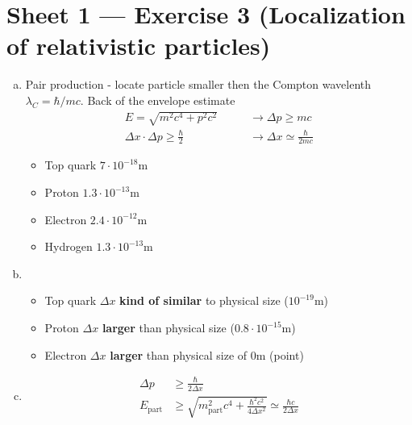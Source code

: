 \documentclass[10pt,a4paper]{report}
\theoremstyle{definition}
\begin{document}
\begin{enumerate}[a)]
\begin{center}
\begin{tikzpicture}[scale=1.2][!]
\end{tikzpicture}
\end{center}


\end{enumerate}


\section{Sheet 1 — Exercise 3 (Localization of relativistic particles)}
\begin{enumerate}[a)]
\item Pair production - locate particle smaller then the Compton wavelenth $\lambda_C=\hbar/mc$. Back of the envelope estimate
\begin{align}
E=\sqrt{m^2c^4+p^2c^2}\qquad&\rightarrow\Delta p\geq mc\\
\Delta x \cdot\Delta p\geq\frac{\hbar}{2}\qquad&\rightarrow\Delta x \simeq\frac{\hbar}{2mc}
\end{align}
\begin{itemize}
\item Top quark $7\cdot10^{-18}$m
\item Proton $1.3\cdot10^{-13}$m
\item Electron $2.4\cdot10^{-12}$m
\item Hydrogen $1.3\cdot10^{-13}$m
\end{itemize}

\item
\begin{itemize}
\item Top quark $\Delta x $ {\bf kind of similar} to physical size ($10^{-19}$m)
\item Proton $\Delta x $ {\bf larger} than physical size ($0.8\cdot10^{-15}$m)
\item Electron $\Delta x $ {\bf larger} than physical size of 0m (point)
\end{itemize}

\item
\begin{align}
\Delta p &\ge\frac{\hbar}{2\Delta x}\\
E_\text{part}&\ge\sqrt{m_\text{part}^2c^4+\frac{\hbar^2c^2}{4\Delta x^2}}\simeq\frac{\hbar c}{2\Delta x}
\end{align}
\end{enumerate}
\newpage
\end{document}
